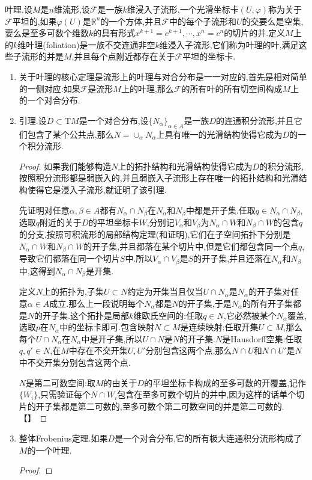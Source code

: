 叶理.设$M$是$n$维流形,设$\mathscr{F}$是一族$k$维浸入子流形,一个光滑坐标卡$(U,\varphi)$称为关于$\mathscr{F}$平坦的,如果$\varphi(U)$是$\mathbb{R}^n$的一个方体,并且$\mathscr{F}$中的每个子流形和$U$的交要么是空集,要么是至多可数个维数$k$的具有形式$x^{k+1}=c^{k+1},\cdots,x^n=c^n$的切片的并.定义$M$上的$k$维叶理(foliation)是一族不交连通非空$k$维浸入子流形,它们称为叶理的叶,满足这些子流形的并是$M$,并且每个点附近都存在关于$\mathscr{F}$平坦的坐标卡.
\begin{enumerate}
	\item 关于叶理的核心定理是流形上的叶理与对合分布是一一对应的,首先是相对简单的一侧对应:如果$\mathscr{F}$是流形$M$上的叶理,那么$\mathscr{F}$的所有叶的所有切空间构成$M$上的一个对合分布.
	\item 引理.设$D\subset\mathrm{T}M$是一个对合分布,设$\{N_{\alpha}\}_{\alpha\in A}$是一族$D$的连通积分流形,并且它们包含了某个公共点,那么$N=\cup_{\alpha}N_{\alpha}$上具有唯一的光滑结构使得它成为$D$的一个积分流形.
	\begin{proof}
		
		如果我们能够构造$N$上的拓扑结构和光滑结构使得它成为$D$的积分流形,按照积分流形都是弱嵌入的,并且弱嵌入子流形上存在唯一的拓扑结构和光滑结构使得它是浸入子流形,就证明了该引理.
		
		先证明对任意$\alpha,\beta\in A$都有$N_{\alpha}\cap N_{\beta}$在$N_{\alpha}$和$N_{\beta}$中都是开子集.任取$q\in N_{\alpha}\cap N_{\beta}$,选取$q$附近的关于$D$的平坦坐标卡$W$,分别记$V_{\alpha}$和$V_{\beta}$为$N_{\alpha}\cap W$和$N_{\beta}\cap W$的包含$q$的分支.按照可积流形的局部结构定理(和证明),它们在子空间拓扑下分别是$N_{\alpha}\cap W$和$N_{\beta}\cap W$的开子集,并且都落在某个切片中,但是它们都包含同一个点$q$,导致它们都落在同一个切片$S$中.所以$V_{\alpha}\cap V_{\beta}$是$S$的开子集,并且还落在$N_{\alpha}$和$N_{\beta}$中,这得到$N_{\alpha}\cap N_{\beta}$是开集.
		
		定义$N$上的拓扑为,子集$U\subset N$约定为开集当且仅当$U\cap N_{\alpha}$是$N_{\alpha}$的开子集对任意$\alpha\in A$成立.那么上一段说明每个$N_{\alpha}$都是$N$的开子集,于是$N_{\alpha}$的所有开子集都是$N$的开子集.这个拓扑是局部$k$维欧氏空间的:任取$q\in N$,它必然被某个$N_{\alpha}$覆盖,选取$p$在$N_{\alpha}$中的坐标卡即可.包含映射$N\subset M$是连续映射:任取开集$U\subset M$,那么每个$U\cap N_{\alpha}$在$N_{\alpha}$中是开子集,所以$U\cap N$是$N$的开子集.$N$是Hausdorff空集:任取$q,q'\in N$,在$M$中存在不交开集$U,U'$分别包含这两个点,那么$N\cap U$和$N\cap U'$是$N$中不交开集分别包含这两个点.
		
		$N$是第二可数空间:取$M$的由关于$D$的平坦坐标卡构成的至多可数的开覆盖,记作$\{W_i\}$,只需验证每个$N\cap W_i$包含在至多可数个切片的并中,因为这样的话单个切片的开子集都是第二可数的,至多可数个第二可数空间的并是第二可数的.【】
	\end{proof}
	\item 整体Frobenius定理.如果$D$是一个对合分布,它的所有极大连通积分流形构成了$M$的一个叶理.
	\begin{proof}
		

\end{proof}
\end{enumerate}
